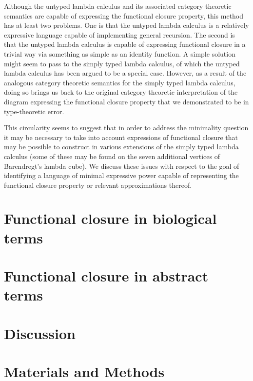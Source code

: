 \documentclass[10pt]{article}
\begin{document}
Although the untyped lambda calculus and its associated category theoretic semantics are capable of expressing the functional closure property, this method has at least two problems. One is that the untyped lambda calculus is a relatively expressive language capable of implementing general recursion. The second is that the untyped lambda calculus is capable of expressing functional closure in a trivial way via something as simple as an identity function. A simple solution might seem to pass to the simply typed lambda calculus, of which the untyped lambda calculus has been argued to be a special case. However, as a result of the analogous category theoretic semantics for the simply typed lambda calculus, doing so brings us back to the original category theoretic interpretation of the diagram expressing the functional closure property that we demonstrated to be in type-theoretic error.

This circularity seems to suggest that in order to address the minimality question it may be necessary to take into account expressions of functional closure that may be possible to construct in various extensions of the simply typed lambda calculus (some of these may be found on the seven additional vertices of Barendregt's lambda cube). We discuss these issues with respect to the goal of identifying a language of minimal expressive power capable of representing the functional closure property or relevant approximations thereof.

\section*{Functional closure in biological terms}


\section*{Functional closure in abstract terms}


\section*{Discussion}

\section*{Materials and Methods}
\end{document}
